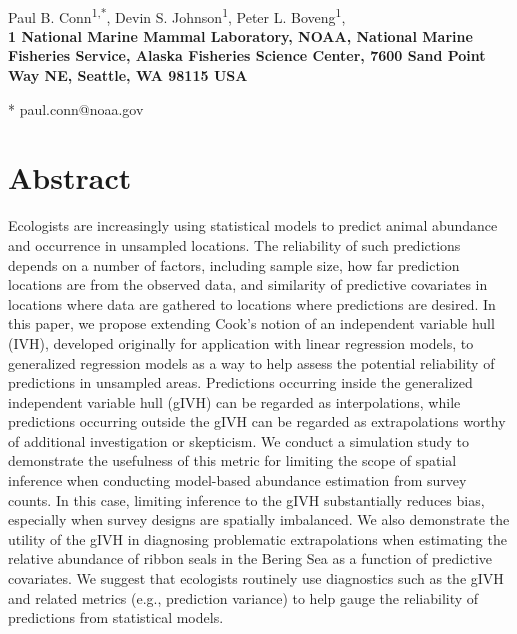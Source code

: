 \documentclass[10pt,letterpaper]{article}
\date{}
\begin{document}
\vspace*{0.35in}

\begin{flushleft}
{\Large
\textbf{}
}
\newline
\\
Paul B. Conn\textsuperscript{1,*},
Devin S. Johnson\textsuperscript{1},
Peter L. Boveng\textsuperscript{1},
\\
\bigskip
\bf{1} National Marine Mammal Laboratory, NOAA, National Marine Fisheries Service,
Alaska Fisheries Science Center, 7600 Sand Point Way NE, Seattle,
WA 98115 USA
\\
\bigskip

* paul.conn@noaa.gov

\end{flushleft}
\section*{Abstract}
Ecologists are increasingly using statistical models to predict animal abundance and occurrence in unsampled locations. The reliability of such predictions depends on a number of factors, including sample size, how far prediction locations are from the observed data, and similarity of predictive covariates in locations where data are gathered to locations where predictions are desired.  In this paper, we propose extending Cook's notion of an independent variable hull (IVH), developed originally for application with linear regression models, to generalized regression models as a way to help assess the potential reliability of predictions in unsampled areas.  Predictions occurring inside the generalized independent variable hull (gIVH) can be regarded as interpolations, while predictions occurring outside the gIVH can be regarded as extrapolations worthy of additional investigation or skepticism. We conduct a simulation study to demonstrate the usefulness of this metric for limiting the scope of spatial inference when conducting model-based abundance estimation from survey counts.  In this case, limiting inference to the gIVH substantially reduces bias, especially when survey designs are spatially imbalanced.  We also demonstrate the utility of the gIVH in diagnosing problematic extrapolations when estimating the relative abundance of ribbon seals in the Bering Sea as a function of predictive covariates.  We suggest that ecologists routinely use diagnostics such as the gIVH and related metrics (e.g., prediction variance) to help gauge the reliability of predictions from statistical models.
\linenumbers
\end{document}
